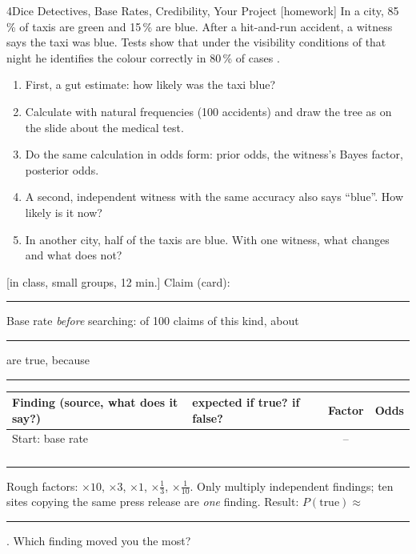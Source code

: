 \begin{uebungsblattb}{4}{Dice Detectives, Base Rates, Credibility, Your Project}
[homework]
In a city, 85\,\% of taxis are green and 15\,\% are blue. After a
hit-and-run accident, a witness says the taxi was blue. Tests show that
under the visibility conditions of that night he identifies the colour
correctly in 80\,\% of cases \parencite{tversky1982evidential}.
\begin{enumerate}
  \item First, a gut estimate: how likely was the taxi blue?
  \item Calculate with natural frequencies (100 accidents) and draw the
    tree as on the slide about the medical test.
  \item Do the same calculation in odds form: prior odds, the witness's
    Bayes factor, posterior odds.
  \item A second, independent witness with the same accuracy also says
    \enquote{blue}. How likely is it now?
  \item In another city, half of the taxis are blue. With one witness,
    what changes and what does not?
\end{enumerate}

[in class, small groups, 12 min.]
Claim (card): \rule{0.7\textwidth}{0.3pt}

Base rate \emph{before} searching: of 100 claims of this kind, about
\rule{12mm}{0.3pt} are true, because\\ \rule{\textwidth}{0.3pt}

\begin{center}
\small
\renewcommand{\arraystretch}{1.7}
\begin{tabular}{|p{}|p{}|c|c|}
\hline
\textbf{Finding} (source, what does it say?) & \textbf{expected if true? if false?} & \textbf{Factor} & \textbf{Odds} \\ \hline
Start: base rate & & -- & \hspace{12mm} \\ \hline
 & & & \\ \hline
 & & & \\ \hline
 & & & \\ \hline
 & & & \\ \hline
\end{tabular}
\end{center}
Rough factors: $\times10$, $\times3$, $\times1$, $\times\tfrac13$,
$\times\tfrac1{10}$. Only multiply independent findings; ten sites
copying the same press release are \emph{one} finding.
Result: $P(\text{true})\approx$ \rule{15mm}{0.3pt}. Which finding moved
you the most?


\end{uebungsblattb}
